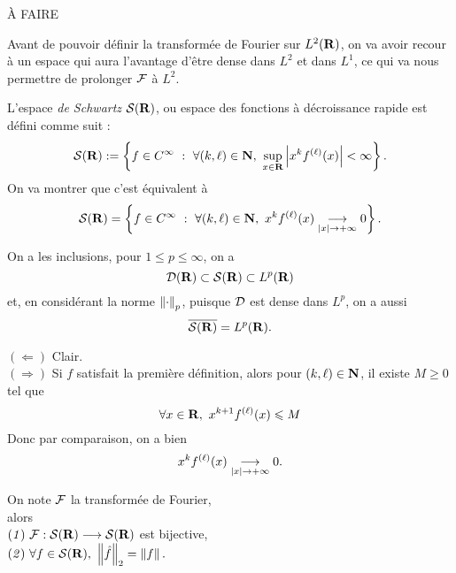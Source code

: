 \documentclass[a4paper,11pt, twoside]{article}
\begin{document}
\begin{Proof}
  À FAIRE
\end{Proof}



Avant de pouvoir définir la transformée de Fourier sur $L^2(\mathbf R)$, on va avoir recour à un espace qui aura l'avantage d'être dense dans $L^2$ et dans $L^1$, ce qui va nous permettre de prolonger $\mathcal F$ à $L^2$.

\begin{Def}
  L'espace \emph{de Schwartz} $\mathcal S(\mathbf R)$, ou espace des fonctions à décroissance rapide est défini comme suit :
  $$\S(\R):=\ens{f\in C^{\infty}\ :\ \forall (k,\ell)\in\N,\ \underset{x\in\R}{\mathrm{sup}}\abs{x^kf^{(\ell)}(x)}<\infty}.$$
  On va montrer que c'est équivalent à 
  $$\mathcal S(\mathbf R)=\left\{f\in C^{\infty}\ :\ \forall (k,\ell)\in\mathbf N,\ x^kf^{(\ell)}(x)\underset{\left| x\right|\to +\infty}{\longrightarrow}0\right\}.$$
\end{Def}



\begin{RQ}
  On a les inclusions, pour $1\leqslant p\leqslant \infty$, on a 
  $$\mathcal D(\mathbf R)\subset\mathcal S(\mathbf R)\subset L^p(\mathbf R)$$
  et, en considérant la norme $\left\lVert\cdot\right\rVert_p$, puisque $\mathcal D$ est dense dans $L^p$, on a aussi 
  $$\overline{\mathcal S(\mathbf R)}=L^p(\mathbf R).$$
\end{RQ}


\begin{Proof}
  $(\Leftarrow)$ Clair.\\
  $(\Rightarrow)$ Si $f$ satisfait la première définition, alors pour $(k,\ell)\in\mathbf N$, il existe $M\geqslant 0$ tel que 
  $$\forall x\in\R,\ x^{k+1}f^{(\ell)}(x)\leqslant M$$
  Donc par comparaison, on a bien 
  $$ x^kf^{(\ell)}(x)\underset{\left| x\right|\to +\infty}{\longrightarrow}0.$$
\end{Proof}


\begin{Th}
  On note $\mathcal F$ la transformée de Fourier,\\

  alors\\
  $(\mathit 1)\ \mathcal F:\mathcal S(\mathbf R)\longrightarrow \mathcal S(\mathbf R)$ est bijective,\\
  $(\mathit 2)\ \forall f\in \mathcal S(\mathbf R),\ \left\lVert\hat f\right\rVert_2=\left\lVert f\right\rVert.$
\end{Th}
\end{document}
